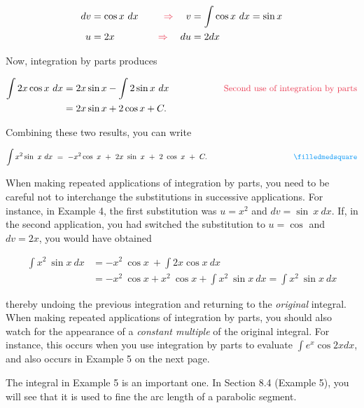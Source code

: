 \documentclass[oneside]{book}
\begin{document}
\begin{alignat*}{3}
dv &= \cos x \ dx \quad &\color{mypink}\Rightarrow\color{black} \quad v &= \int \cos x \ dx = \sin x \\
u &= 2x \quad &\color{mypink}\Rightarrow\color{black} \quad du &= 2 dx
\end{alignat*}

\noindent Now, integration by parts produces

\begin{align*}
\int 2x \cos x \ dx &= 2x \sin x - \int 2 \sin x \ dx \hspace{2cm} \text{\color{mypink}\small Second use of integration by parts} \\
&= 2x \sin x + 2 \cos x + C.
\end{align*}

\noindent Combining these two results, you can write

$$ \int x^2  \sin \ x \ dx \ = \ -x^2  \cos \ x \ + \ 2x \ \sin \ x \ + \ 2 \ \cos \ x \ + \ C. \hspace{4cm} \color{myblue} \filledmedsquare$$

\vspace{1cm}

When making repeated applications of integration by parts, you need to be careful not to interchange the substitutions in successive applications. For instance, in Example 4, the first substitution was $u = x^2$ and $dv = \sin \ x \ dx$. If, in the second application, you had switched the substitution to $u = \cos$ and $dv = 2x$, you would have obtained

\begin{align*}
\int x^2 \ \sin x \ dx &= -x^2 \ \cos x \ + \int 2x \cos x \ dx \\
&= -x^2 \ \cos x + x^2 \ \cos x + \int x^2 \ \sin x \ dx = \int x^2 \ \sin x \ dx
\end{align*} 

\noindent thereby undoing the previous integration and returning to the \textit{original} integral. When making repeated applications of integration by parts, you should also watch for the appearance of a \textit{constant multiple} of the original integral. For instance, this occurs when you use integration by parts to evaluate $\int e^x \cos 2x dx$, and also occurs in Example 5 on the next page.

The integral in Example 5 is an important one. In Section 8.4 (Example 5), you will see that it is used to fine the arc length of a parabolic segment. 
\end{document}
